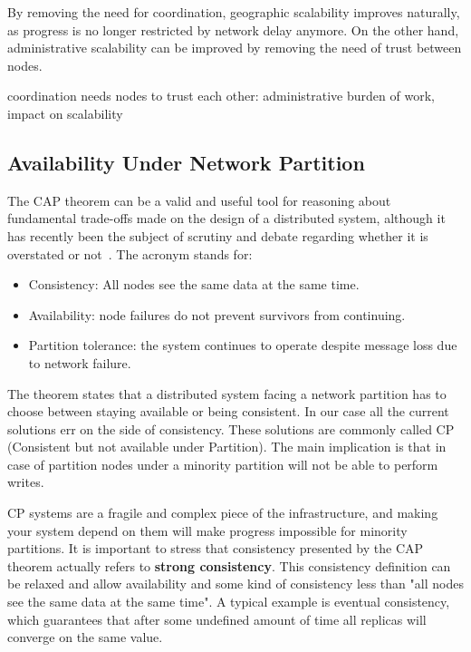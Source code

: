 \documentclass{sig-alternate}
\begin{document}
By removing the need for coordination, geographic scalability improves naturally, as progress is no longer restricted by network delay anymore. On the other hand, administrative scalability can be improved by removing the need of trust between nodes. 

coordination needs nodes to trust each other: administrative burden of work, impact on scalability


\subsection{Availability Under Network Partition}

The CAP theorem can be a valid and useful tool for reasoning about fundamental trade-offs made on the design of a distributed system, although it has recently been the subject of scrutiny and debate regarding whether it is overstated or not~\cite{Kleppmann:CAP}. The acronym stands for:

\begin{itemize}
\item Consistency: All nodes see the same data at the same time.
\item Availability: node failures do not prevent survivors from continuing.
\item Partition tolerance: the system continues to operate despite message loss due to network failure.
\end{itemize}
    
The theorem states that a distributed system facing a network partition has to choose between staying available or being consistent. In our case all the current solutions err on the side of consistency. These solutions are commonly called CP (Consistent but not available under Partition). The main implication is that in case of partition nodes under a minority partition will not be able to perform writes.

CP systems are a fragile and complex piece of the infrastructure, and making your system depend on them will make progress impossible for minority partitions. It is important to stress that consistency presented by the CAP theorem actually refers to \textbf{strong consistency}. This consistency definition can be relaxed and allow availability and some kind of consistency less than "all nodes see the same data at the same time". 
A typical example is eventual consistency, which guarantees that after some undefined amount of time all replicas will converge on the same value.
\end{document}
